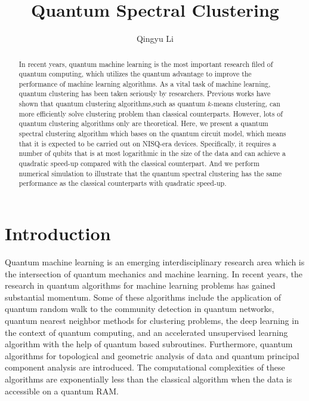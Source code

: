 \documentclass[onecolumn,notitlepage]{revtex4-1}
\begin{document}

\title{Quantum Spectral Clustering}

\author{Qingyu Li}



\begin{abstract}
In recent years, quantum machine learning is the most important research filed of quantum computing, which utilizes the quantum advantage to improve the performance of machine learning algorithms. 
As a vital task of machine learning, quantum clustering has been taken seriously by researchers. 
Previous works have shown that quantum clustering algorithms,such as quantum $k$-means clustering, can more efficiently solve clustering problem than classical counterparts. 
However, lots of quantum clustering algorithms only are theoretical. 
Here, we present a quantum spectral clustering algorithm which bases on the quantum circuit model, which means that it is expected to be carried out on NISQ-era devices. 
Specifically, it requires a number of qubits that is at most logarithmic in the size of the data and can achieve a quadratic speed-up compared with the classical counterpart.
And we perform numerical simulation to illustrate that the quantum spectral clustering has the same performance as the classical counterparts with quadratic speed-up.
\end{abstract}


\maketitle

\section{Introduction}
Quantum machine learning is an emerging interdisciplinary research area which is the intersection of quantum mechanics and machine learning. 
In recent years, the research in quantum algorithms for machine learning problems has gained substantial momentum. 
Some of these algorithms include the application of quantum random walk to the community detection in quantum networks, quantum nearest neighbor methods for clustering problems, the deep learning in the context of quantum computing, and an accelerated unsupervised learning algorithm with the help of quantum based subroutines. 
Furthermore, quantum algorithms for topological and geometric analysis of data and quantum principal component analysis are introduced. 
The computational complexities of these algorithms are exponentially less than the classical algorithm when the data is accessible on a quantum RAM.
\end{document}
